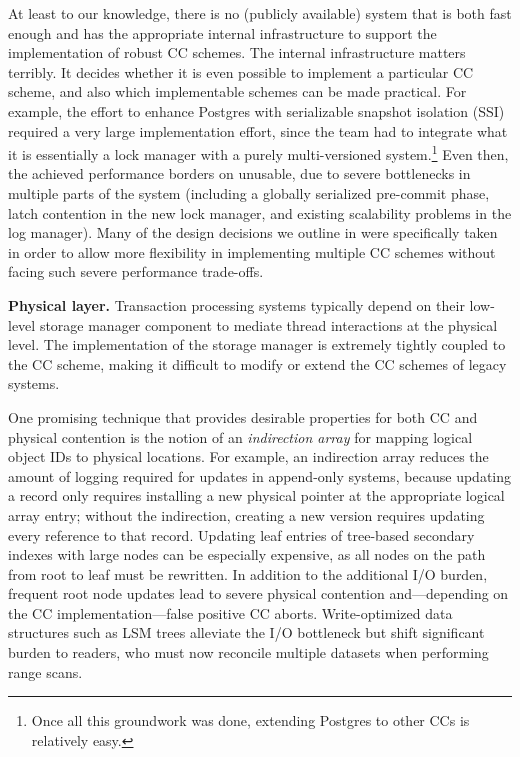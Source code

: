 At least to our knowledge, there is no (publicly available) system that is both fast enough and has the appropriate internal infrastructure to support the implementation of robust CC schemes. The internal infrastructure matters terribly. It decides whether it is even possible to implement a particular CC scheme, and also which implementable schemes can be made practical. For example, the effort to enhance Postgres with serializable snapshot isolation (SSI) required a very large implementation effort, since the team had to integrate what it is essentially a lock manager with a purely multi-versioned system.\footnote{Once all this groundwork was done, extending Postgres to other CCs is relatively easy.} Even then, the achieved performance borders on unusable, due to severe bottlenecks in multiple parts of the system (including a globally serialized pre-commit phase, latch contention in the new lock manager, and existing scalability problems in the log manager).  Many of the design decisions we outline in  were specifically taken in order to allow more flexibility in implementing multiple CC schemes without facing such severe performance trade-offs.

\vspace{2mm}
{\bf Physical layer.} 
Transaction processing systems typically depend on their low-level storage manager component to mediate thread interactions at the physical level.
The implementation of the storage manager is extremely tightly coupled to the CC scheme, making it difficult to modify or extend the CC schemes of legacy systems.  

One promising technique that provides desirable properties for both CC and physical contention is the notion of an {\em indirection array} \cite{SadoghiRCB13,Diaconu+13} for mapping logical object IDs to physical locations.
For example, an indirection array reduces the amount of logging required for updates in append-only systems, because updating a record only requires installing a new physical pointer at the appropriate logical array entry; without the indirection, creating a new version requires updating every reference to that record. Updating leaf entries of tree-based secondary indexes with large nodes can be especially expensive, as all nodes on the path from root to leaf must be rewritten. In addition to the additional I/O burden, frequent root node updates lead to severe physical contention and---depending on the CC implementation---false positive CC aborts. Write-optimized data structures such as LSM trees \cite{SearsR12} alleviate the I/O bottleneck but shift significant burden to readers, who must now reconcile multiple datasets when performing range scans. 

